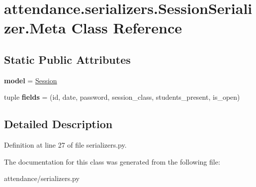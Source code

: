 \hypertarget{classattendance_1_1serializers_1_1_session_serializer_1_1_meta}{}\section{attendance.\+serializers.\+Session\+Serializer.\+Meta Class Reference}
\label{classattendance_1_1serializers_1_1_session_serializer_1_1_meta}
\subsection*{Static Public Attributes}
\begin{DoxyCompactItemize}
\item 
\hypertarget{classattendance_1_1serializers_1_1_session_serializer_1_1_meta_ac48cff53467cc5a9aa93a806ca06b91f}{}\label{classattendance_1_1serializers_1_1_session_serializer_1_1_meta_ac48cff53467cc5a9aa93a806ca06b91f} 
{\bfseries model} = \hyperlink{classattendance_1_1models_1_1_session}{Session}
\item 
\hypertarget{classattendance_1_1serializers_1_1_session_serializer_1_1_meta_a2e29ab57c46a76e6c8989fe3e508d5c9}{}\label{classattendance_1_1serializers_1_1_session_serializer_1_1_meta_a2e29ab57c46a76e6c8989fe3e508d5c9} 
tuple {\bfseries fields} = (\textquotesingle{}id\textquotesingle{}, \textquotesingle{}date\textquotesingle{}, \textquotesingle{}password\textquotesingle{}, \textquotesingle{}session\+\_\+class\textquotesingle{}, \textquotesingle{}students\+\_\+present\textquotesingle{}, \textquotesingle{}is\+\_\+open\textquotesingle{})
\end{DoxyCompactItemize}


\subsection{Detailed Description}


Definition at line 27 of file serializers.\+py.



The documentation for this class was generated from the following file\+:\begin{DoxyCompactItemize}
\item 
attendance/serializers.\+py\end{DoxyCompactItemize}
